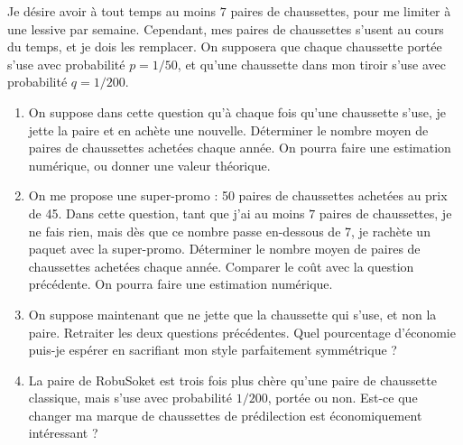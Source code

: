 \documentclass[solutions]{exercices}
\begin{document}
\begin{exercice}
	Je désire avoir à tout temps au moins $7$ paires de chaussettes, pour me limiter à une lessive par semaine. Cependant, mes paires de chaussettes s'usent au cours du temps, et je dois les remplacer. On supposera que chaque chaussette portée s'use avec probabilité $p = 1/50$, et qu'une chaussette dans mon tiroir s'use avec probabilité $q = 1/200$.
	\begin{enumerate}
		\item On suppose dans cette question qu'à chaque fois qu'une chaussette s'use, je jette la paire et en achète une nouvelle. Déterminer le nombre moyen de paires de chaussettes achetées chaque année. On pourra faire une estimation numérique, ou donner une valeur théorique.
		\item On me propose une super-promo : 50 paires de chaussettes achetées au prix de 45. Dans cette question, tant que j'ai au moins $7$ paires de chaussettes, je ne fais rien, mais dès que ce nombre passe en-dessous de 7, je rachète un paquet avec la super-promo. Déterminer le nombre moyen de paires de chaussettes achetées chaque année. Comparer le coût avec la question précédente. On pourra faire une estimation numérique.
		\item On suppose maintenant que ne jette que la chaussette qui s'use, et non la paire. Retraiter les deux questions précédentes. Quel pourcentage d'économie puis-je espérer en sacrifiant mon style parfaitement symmétrique ?
		\item La paire de RobuSoket est trois fois plus chère qu'une paire de chaussette classique, mais s'use avec probabilité $1/200$, portée ou non. Est-ce que changer ma marque de chaussettes de prédilection est économiquement intéressant ?
	\end{enumerate}
\end{exercice}
\end{document}
